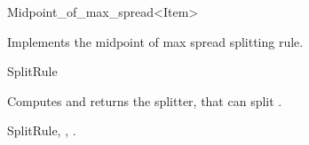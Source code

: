 

\begin{ccRefFunctionObjectClass}{Midpoint_of_max_spread<Item>}  %


\ccDefinition
Implements the midpoint of max spread splitting rule.


\ccIsModel

SplitRule

\ccTypes


\ccCreation
{}  %



{Computes and returns the splitter, that can split .}

\ccSeeAlso

SplitRule,
,
.

\end{ccRefFunctionObjectClass}


